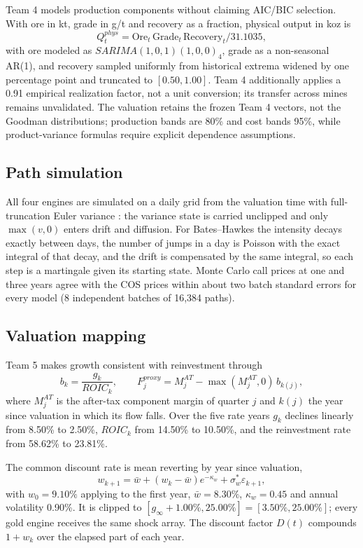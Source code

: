 Team 4 models production components without claiming AIC/BIC selection. With ore in kt, grade in g/t and recovery as a fraction, physical output in koz is
\begin{equation}
Q_t^{phys}=\mathrm{Ore}_t\,\mathrm{Grade}_t\,\mathrm{Recovery}_t/31.1035,
\label{eq:production_formula}
\end{equation}
with ore modeled as $SARIMA(1,0,1)(1,0,0)_4$, grade as a non-seasonal AR(1), and recovery sampled uniformly from historical extrema widened by one percentage point and truncated to $[0.50,1.00]$. Team 4 additionally applies a 0.91 empirical realization factor, not a unit conversion; its transfer across mines remains unvalidated. The valuation retains the frozen Team 4 vectors, not the Goodman distributions; production bands are 80\% and cost bands 95\%, while product-variance formulas require explicit dependence assumptions.

\subsection{Path simulation}
All four engines are simulated on a daily grid from the valuation time with full-truncation Euler variance \citep{lord2010}: the variance state is carried unclipped and only $\max(v,0)$ enters drift and diffusion. For Bates--Hawkes the intensity decays exactly between days, the number of jumps in a day is Poisson with the exact integral of that decay, and the drift is compensated by the same integral, so each step is a martingale given its starting state. Monte Carlo call prices at one and three years agree with the COS prices within about two batch standard errors for every model (8 independent batches of 16,384 paths).

\subsection{Valuation mapping}
Team 5 makes growth consistent with reinvestment through
\begin{equation}
b_k=\frac{g_k}{ROIC_k},\qquad
F_j^{proxy}=M_j^{AT}-\max(M_j^{AT},0)\,b_{k(j)},
\label{eq:reinvestment}
\end{equation}
where $M_j^{AT}$ is the after-tax component margin of quarter $j$ and $k(j)$ the year since valuation in which its flow falls. Over the five rate years $g_k$ declines linearly from 8.50\% to 2.50\%, $ROIC_k$ from 14.50\% to 10.50\%, and the reinvestment rate from 58.62\% to 23.81\%.

The common discount rate is mean reverting by year since valuation,
\begin{equation}
w_{k+1}=\bar w+(w_k-\bar w)e^{-\kappa_w}+\sigma_w^*\varepsilon_{k+1},
\label{eq:wacc_process}
\end{equation}
with $w_0=9.10\%$ applying to the first year, $\bar w=8.30\%$, $\kappa_w=0.45$ and annual volatility 0.90\%. It is clipped to $[g_\infty+1.00\%,25.00\%]=[3.50\%,25.00\%]$; every gold engine receives the same shock array. The discount factor $D(t)$ compounds $1+w_k$ over the elapsed part of each year.

